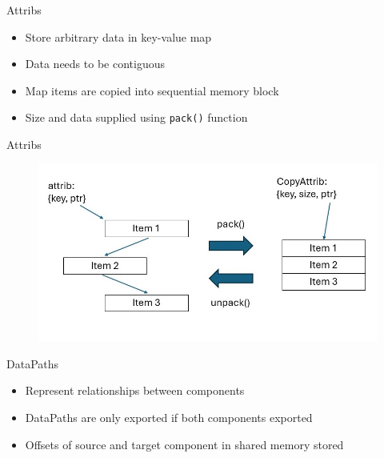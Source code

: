 \documentclass{beamer}
\begin{document}
\begin{frame}{Attribs}
    \begin{itemize}
        \item Store arbitrary data in key-value map
        \item Data needs to be contiguous
        \item Map items are copied into sequential memory block
        \item Size and data supplied using \lstinline|pack()| function
    \end{itemize}
\end{frame}

\begin{frame}{Attribs}
    \begin{figure}[!ht]
        \includegraphics[scale=0.53]{../images/Slide4.jpg}
        \centering
    \end{figure}
\end{frame}

\begin{frame}{DataPaths}
    \begin{itemize}
        \item Represent relationships between components
        \item DataPaths are only exported if both components exported
        \item Offsets of source and target component in shared memory stored
    \end{itemize}
\end{frame}
\end{document}
